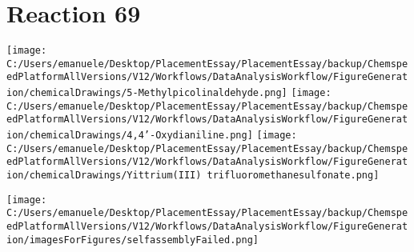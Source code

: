 \documentclass{article}%
\begin{document}
\section*{Reaction 69}%
%
\begin{scheme}[H]%
\begin{minipage}{0.5\textwidth}%
\texttt{[image: C:/Users/emanuele/Desktop/PlacementEssay/PlacementEssay/backup/ChemspeedPlatformAllVersions/V12/Workflows/DataAnalysisWorkflow/FigureGeneration/chemicalDrawings/5-Methylpicolinaldehyde.png]}%
\texttt{[image: C:/Users/emanuele/Desktop/PlacementEssay/PlacementEssay/backup/ChemspeedPlatformAllVersions/V12/Workflows/DataAnalysisWorkflow/FigureGeneration/chemicalDrawings/4,4'-Oxydianiline.png]}%
\texttt{[image: C:/Users/emanuele/Desktop/PlacementEssay/PlacementEssay/backup/ChemspeedPlatformAllVersions/V12/Workflows/DataAnalysisWorkflow/FigureGeneration/chemicalDrawings/Yittrium(III) trifluoromethanesulfonate.png]}%
\end{minipage}%
\begin{minipage}{0.5\textwidth}%
\begin{center}%
\texttt{[image: C:/Users/emanuele/Desktop/PlacementEssay/PlacementEssay/backup/ChemspeedPlatformAllVersions/V12/Workflows/DataAnalysisWorkflow/FigureGeneration/imagesForFigures/selfassemblyFailed.png]}%
\end{center}%
\end{minipage}%
\caption{Self-assembly of components 3, 15, with Yittrium(III) in a 3.0:1.5:1.0 molar ratio in CH$_3$CN at 60\textdegree C for 40h. These are the reagents (starting materials) for reaction 69.}%
\end{scheme}%
\end{document}
